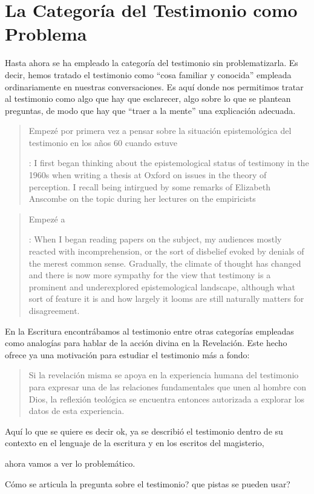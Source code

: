 \section{La Categoría del Testimonio como Problema}

Hasta ahora se ha empleado la categoría del testimonio sin problematizarla. Es
decir, hemos tratado el testimonio como \enquote{cosa familiar y conocida}
empleada ordinariamente en nuestras conversaciones. Es aquí donde nos permitimos
tratar al testimonio como algo que hay que esclarecer, algo sobre lo que se
plantean preguntas, de modo que hay que \enquote{traer a la mente} una
explicación adecuada.


\blockquote[{\cite[vii]{coady1992test}}: I first began thinking about the
epistemological status of testimony in the 1960s when writing a thesis at Oxford
on issues in the theory of perception. \textelp{} I recall being intirgued by
some remarks of Elizabeth Anscombe on the topic during her lectures on the
empiricists \textelp{}]{Empezé por primera vez a pensar sobre la situación
  epistemológica del testimonio en los años 60 cuando estuve}

\blockquote[{\cite[vii]{coady1992test}}: When I began reading papers on the
subject, my audiences mostly reacted with incomprehension, or the sort of
disbelief evoked by denials of the merest common sense. Gradually, the climate
of thought has changed and there is now more sympathy for the view that
testimony is a prominent and underexplored epistemological landscape, although
what sort of feature it is and how largely it looms are still naturally matters
for disagreement.]{Empezé a }


En la Escritura encontrábamos al testimonio entre otras categorías empleadas
como analogías para hablar de la acción divina en la Revelación. Este hecho
ofrece ya una motivación para estudiar el testimonio más a fondo:
\blockquote[{\cite[1523]{latourelle2000testimonio}}]{Si la revelación misma se
  apoya en la experiencia humana del testimonio para expresar una de las
  relaciones fundamentales que unen al hombre con Dios, la reflexión teológica
  se encuentra entonces autorizada a explorar los datos de esta experiencia.}

Aquí lo que se quiere es decir
ok, ya se describió el testimonio dentro de su contexto en el lenguaje de la
escritura y en los escritos del magisterio,

ahora vamos a ver lo problemático.

Cómo se articula la pregunta sobre el testimonio? que pistas se pueden usar?





